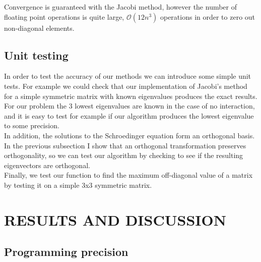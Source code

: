 \documentclass[%
 reprint,
 nobalancelastpage,
 amsmath,amssymb,
 aps,
]{revtex4-1}
\begin{document}
Convergence is guaranteed with the Jacobi method, however the number of floating point operations is quite large, $\mathcal{O}(12n^{3})$ operations in order to zero out non-diagonal elements.

%
\subsection{Unit testing}
In order to test the accuracy of our methods we can introduce some simple unit tests. For example we could check that our implementation of Jacobi's method for a simple symmetric matrix with known eigenvalues produces the exact results. For our problem the 3 lowest eigenvalues are known in the case of no interaction, and it is easy to test for example if our algorithm produces the lowest eigenvalue to some precision. \\
In addition, the solutions to the Schroedinger equation form an orthogonal basis. In the previous subsection I show that an orthogonal transformation preserves orthogonality, so we can test our algorithm by checking to see if the resulting eigenvectors are orthogonal.\\
Finally, we test our function to find the maximum off-diagonal value of a matrix by testing it on a simple 3x3 symmetric matrix.


\section{RESULTS AND DISCUSSION}

\subsection{Programming precision}
\end{document}
